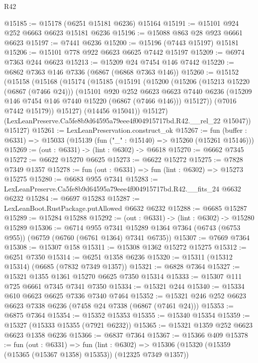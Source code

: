 \begin{lexlean}{R42}
\begin{coremodule}
{@15185 := @15178 (@6251 @15181 @6236) @15164
@15191 := @15101 @924 @252 @6663 @6623 @15181 @6236
@15196 := @15088 @863 @28 @923 @6661 @6623
@15197 := @7441 @6236
@15200 := @15196 (@7443 @15197) @15181
@15206 := @15101 @778 @922 @6623 @6625 @7442 @15197
@15209 := @6974 @7363 @244 @6623
@15213 := @15209 @24 @7454 @146 @7442
@15220 := @6862 @7363 @146 @7336 (@6867 (@6868 @7363 @146))
@15260 := @15152
    (@15158
      (@15168
        (@15174
          (@15185
            (@15191
              (@15200
                (@15206
                  (@15213 @15220 (@6867 (@7466 @24)))
                  (@15101
                    @920
                    @252
                    @6623
                    @6623
                    @7440
                    @6236
                    (@15209 @146 @7454 @146 @7440 @15220 (@6867 (@7466 @146)))
                    @15127))
                (@7016 @7442 @15179))
              @15127)
            (@14456 @15041))
          @15127)
        (LexLeanPreserve.Ca5fe8b9d64595a79eee4f004915717bd.R42.__rel_22 @15047))
      @15127)
@15261 := LexLeanPreservation.construct_ok
@15267 := fun (buffer : @6331) => @15033 (@15139 (fun ("_" : @15140) => @15260 (@15261 @15146)))
@15269 := (out : @6331) -> (lint : @6302) -> @6618
@15270 := @6662 @7345
@15272 := @6622 @15270 @6625
@15273 := @6622 @15272
@15275 := @7828 @7349 @1357
@15278 := fun (out : @6331) => fun (lint : @6302) => @15273 @15275
@15280 := @6683 @955 @7341
@15283 := LexLeanPreserve.Ca5fe8b9d64595a79eee4f004915717bd.R42.__fits_24 @6632 @6232
@15284 := @6697 @15283
@15287 := LexLeanBoot.RustPackage.putAllowed @6632 @6232
@15288 := @6685 @15287
@15289 := @15284 @15288
@15292 := (out : @6331) -> (lint : @6302) -> @15280 @15289
@15306 := @6714
    @955
    @7341
    @15289
    @1364
    @7364
    (@6743 (@6753 @955))
    (@6759 (@6760 (@6761 @1364) @7341 @6735))
@15307 := @7669 @7364
@15308 := @15307 @158
@15311 := @15308 @1362 @15272 @15275
@15312 := @6251 @7350
@15314 := @6251 @1358 @6236
@15320 := @15311 (@15312 @15314) (@6685 (@7832 @7349 @1357))
@15321 := @6828 @7364
@15327 := @15321 @1355 @1361 @15270 @6625 @7350 @15314
@15333 := @15307 @111 @725 @6661 @7345 @7341 @7350
@15334 := @15321 @244
@15340 := @15334 @610 @6623 @6625 @7336 @7340 @7464
@15352 := @15321 @246 @252 @6623 @6623 @7338 @6236 (@7458 @24 @7338 (@6867 (@7461 @24)))
@15353 := @6875 @7364
@15354 := @15352 @15353
@15355 := @15340 @15354
@15359 := @15327 (@15333 @15355 (@7921 @6232))
@15365 := @15321 @1359 @252 @6623 @6623 @1358 @6236
@15366 := @6837 @7364
@15367 := @15366 @409
@15378 := fun (out : @6331) =>
  fun (lint : @6302) => @15306 (@15320 (@15359 (@15365 (@15367 @1358) @15353)) (@12325 @7349 @1357))
}
\end{coremodule}
\end{lexlean}
